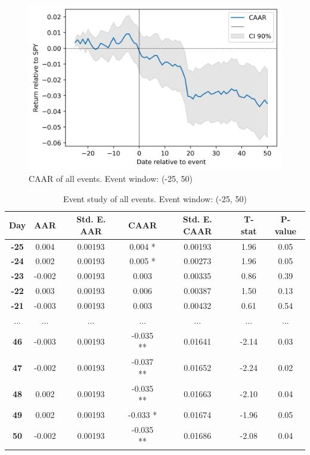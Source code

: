 \begin{figure}[h]
  \centering
  \includegraphics[width=1\textwidth]{figures/esAllLong.png}
  \caption{CAAR of all events. Event window: (-25, 50)}
  \label{fig:esAllLong}
\end{figure}

\begin{table}[h]
    \centering
    \caption{Event study of all events. Event window: (-25, 50)}
    \label{tab:esAllLong}
    \begin{tabular}{|c|c|c|c|c|c|c|}
        \hline
        \textbf{Day} & \textbf{AAR} & \textbf{Std. E. AAR} & \textbf{CAAR} & \textbf{Std. E. CAAR} & \textbf{T-stat} & \textbf{P-value} \\
        \hline
        \textbf{-25} & 0.004 & 0.00193 & 0.004 * & 0.00193 & 1.96 & 0.05 \\
        \hline
        \textbf{-24} & 0.002 & 0.00193 & 0.005 * & 0.00273 & 1.96 & 0.05 \\
        \hline
        \textbf{-23} & -0.002 & 0.00193 & 0.003 & 0.00335 & 0.86 & 0.39 \\
        \hline
        \textbf{-22} & 0.003 & 0.00193 & 0.006 & 0.00387 & 1.50 & 0.13 \\
        \hline
        \textbf{-21} & -0.003 & 0.00193 & 0.003 & 0.00432 & 0.61 & 0.54 \\
        \hline
        ... & ... & ... & ... & ... & ... & ... \\
        \hline
        \textbf{46} & -0.003 & 0.00193 & -0.035 ** & 0.01641 & -2.14 & 0.03 \\
        \hline
        \textbf{47} & -0.002 & 0.00193 & -0.037 ** & 0.01652 & -2.24 & 0.02 \\
        \hline
        \textbf{48} & 0.002 & 0.00193 & -0.035 ** & 0.01663 & -2.10 & 0.04 \\
        \hline
        \textbf{49} & 0.002 & 0.00193 & -0.033 * & 0.01674 & -1.96 & 0.05 \\
        \hline
        \textbf{50} & -0.002 & 0.00193 & -0.035 ** & 0.01686 & -2.08 & 0.04 \\
        \hline
    \end{tabular}
\end{table}

